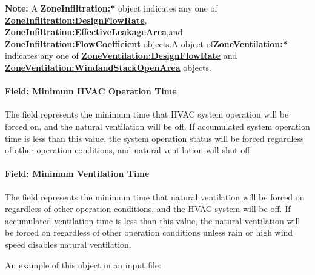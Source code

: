 \textbf{Note:} A \textbf{ZoneInfiltration:*} object indicates any one of \textbf{\hyperref[zoneinfiltrationdesignflowrate]{ZoneInfiltration:DesignFlowRate}}, \textbf{\hyperref[zoneinfiltrationeffectiveleakagearea]{ZoneInfiltration:EffectiveLeakageArea}},and \textbf{\hyperref[zoneinfiltrationflowcoefficient]{ZoneInfiltration:FlowCoefficient}} objects.A object of\textbf{ZoneVentilation:*} indicates any one of \textbf{\hyperref[zoneventilationdesignflowrate]{ZoneVentilation:DesignFlowRate}} and \textbf{\hyperref[zoneventilationwindandstackopenarea]{ZoneVentilation:WindandStackOpenArea}} objects.

\paragraph{Field: Minimum HVAC Operation Time}\label{field-minimum-hvac-operation-time}

 The field represents the minimum time that HVAC system operation will be forced on, and the natural ventilation will be off. If accumulated system operation time is less than this value, the system operation status will be forced regardless of other operation conditions, and natural ventilation will shut off.

\paragraph{Field: Minimum Ventilation Time}\label{field-minimum-ventilation-time}

 The field represents the minimum time that natural ventilation will be forced on regardless of other operation conditions, and the HVAC system will be off. If accumulated ventilation time is less than this value, the natural ventilation will be forced on regardless of other operation conditions unless rain or high wind speed disables natural ventilation.


An example of this object in an input file:

